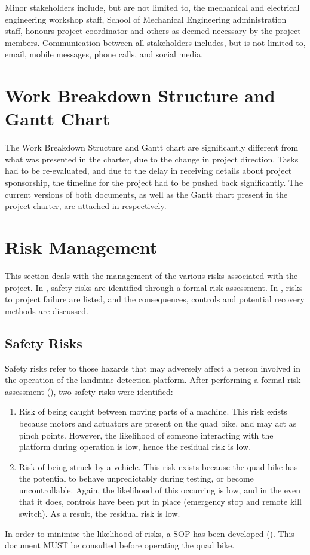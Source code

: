 \documentclass[main.tex]{subfiles}
\begin{document}
Minor stakeholders include, but are not limited to, the mechanical and electrical engineering workshop staff, School of Mechanical Engineering administration staff, honours project coordinator and others as deemed necessary by the project members. Communication between all stakeholders includes, but is not limited to, email, mobile messages, phone calls, and social media. %

\section{Work Breakdown Structure and Gantt Chart}
The Work Breakdown Structure and Gantt chart are significantly different from what was presented in the charter, due to the change in project direction. Tasks had to be re-evaluated, and due to the delay in receiving details about project sponsorship, the timeline for the project had to be pushed back significantly. The current versions of both documents, as well as the Gantt chart present in the project charter, are attached in  respectively.  

\section{Risk Management}
This section deals with the management of the various risks associated with the project. In , safety risks are identified through a formal risk assessment. In , risks to project failure are listed, and the consequences, controls and potential recovery methods are discussed. 

\subsection{Safety Risks}
Safety risks refer to those hazards that may adversely affect a person involved in the operation of the landmine detection platform. After performing a formal risk assessment (), two safety risks were identified:
\begin{enumerate}
\item Risk of being caught between moving parts of a machine. This risk exists because motors and actuators are present on the quad bike, and may act as pinch points. However, the likelihood of someone interacting with the platform during operation is low, hence the residual risk is low.
\item Risk of being struck by a vehicle. This risk exists because the quad bike has the potential to behave unpredictably during testing, or become uncontrollable. Again, the likelihood of this occurring is low, and in the even that it does, controls have been put in place (emergency stop and remote kill switch). As a result, the residual risk is low.
\end{enumerate}
In order to minimise the likelihood of risks, a SOP has been developed (). This document MUST be consulted before operating the quad bike. 
% 
\end{document}
